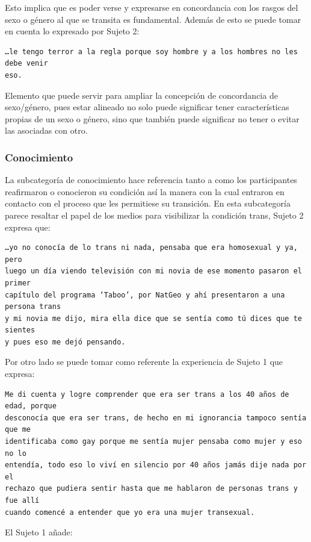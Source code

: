 Esto implica que es poder verse y expresarse en concordancia con los
rasgos del sexo o género al que se transita es fundamental. Además de esto se
puede tomar en cuenta lo expresado por Sujeto 2:

\begin{verbatim}
…le tengo terror a la regla porque soy hombre y a los hombres no les debe venir
eso.
\end{verbatim}

Elemento que puede servir para ampliar la concepción de concordancia de
sexo/género, pues estar alineado no solo puede significar tener características
propias de un sexo o género, sino que también puede significar no tener o evitar
las asociadas con otro.

\subsubsection{Conocimiento}

La subcategoría de conocimiento hace referencia tanto a como los participantes
reafirmaron o conocieron su condición así la manera con la cual entraron en
contacto con el proceso que les permitiese su transición. En esta subcategoría
parece resaltar el papel de los medios para visibilizar la condición trans,
Sujeto 2 expresa que:

\begin{verbatim}
…yo no conocía de lo trans ni nada, pensaba que era homosexual y ya, pero
luego un día viendo televisión con mi novia de ese momento pasaron el primer
capítulo del programa ‘Taboo’, por NatGeo y ahí presentaron a una persona trans
y mi novia me dijo, mira ella dice que se sentía como tú dices que te sientes
y pues eso me dejó pensando.
\end{verbatim}

Por otro lado se puede tomar como referente la experiencia de Sujeto 1 que
expresa:

\begin{verbatim}
Me di cuenta y logre comprender que era ser trans a los 40 años de edad, porque
desconocía que era ser trans, de hecho en mi ignorancia tampoco sentía que me
identificaba como gay porque me sentía mujer pensaba como mujer y eso no lo
entendía, todo eso lo viví en silencio por 40 años jamás dije nada por el
rechazo que pudiera sentir hasta que me hablaron de personas trans y fue allí
cuando comencé a entender que yo era una mujer transexual.
\end{verbatim}

El Sujeto 1 añade:

